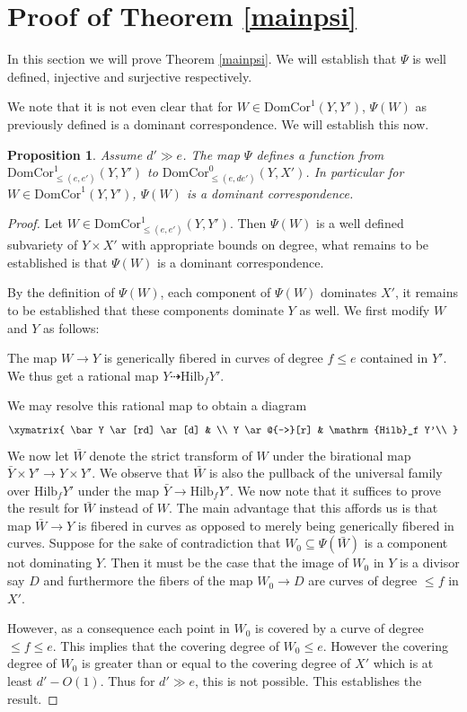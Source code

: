 \documentclass[12pt]{amsart}
\numberwithin{equation}{section}
\newtheorem{proposition}[theorem]{Proposition}
\numberwithin{theorem}{section}
\theoremstyle{definition}
\theoremstyle{definition}
\def\dra{{\dashrightarrow}}
\newcommand{\Hilb}{\mathrm{Hilb}}
\def \DC{{\mathrm{DomCor}}}
\begin{document}
\section{Proof of Theorem \ref{mainpsi}}
In this section we will prove Theorem \ref{mainpsi}. We will establish that  $\Psi$ is well defined, injective and surjective respectively.

We note that it is not even clear that for $W \in \DC^1(Y,Y')$, $\Psi(W)$ as previously defined is a dominant correspondence. We will establish this now. 
\begin{proposition} Assume $d' \gg e$.
    The map $\Psi$ defines a function from  $\DC^1_{\le (e,e')} (Y, Y')$ to $\DC^0 _{\le (e,de')}(Y,X')$. In particular for  $W \in \DC^1(Y,Y')$, $\Psi(W)$ is a dominant correspondence.
\end{proposition}
\begin{proof}
      Let $W \in \DC^1_{\le (e,e')} (Y, Y').$ Then $\Psi(W)$ is a well defined subvariety of $Y \times X'$ with appropriate bounds on degree, what remains to be established is that $\Psi(W)$ is a dominant correspondence.

      By the definition of $\Psi(W)$, each component of $\Psi(W)$ dominates $X'$, it remains to be established that these components dominate $Y$ as well.
      We first modify $W $ and $Y$ as follows:
    
    The map $W \to Y$ is generically fibered in curves of degree $f \le e$ contained in $Y'$. We thus get a rational map $Y \dra \Hilb_f Y'$.

     We may resolve this rational map to obtain a diagram 
\[
    \xymatrix{
\bar Y \ar[rd] \ar[d] & \\
Y \ar@{-->}[r] & \Hilb_f Y'\\
}
\]
We now let $\bar W$ denote the strict transform of $W$ under the birational map $\bar Y \times Y' \to Y \times Y'$. We observe that $\bar W$ is also the pullback of the universal family over $\Hilb_f Y'$  under the map $\bar Y \to \Hilb_f Y'$.
We now note that it suffices to prove the result for $\bar W$ instead of $W$. The main advantage that this affords us is that map $\bar W \to Y$ is fibered in curves as opposed to merely being generically fibered in curves. 
Suppose for the sake of contradiction that  $W_0 \subseteq \Psi(\bar W)$ is a component not dominating $Y$. Then it must be the case that the image of $W_0$ in $Y$ is a divisor say $D$ and furthermore the fibers of the map $W_0 \to D $ are curves of degree $\le f$ in $X'$.

 However, as a consequence each point in $W_0$ is covered by a curve of degree $\le f \le e$. This implies that the covering degree of $W_0 \le e$. However the covering degree of $W_0$ is greater than or equal to the covering degree of $X'$ which is at least $d' - O(1)$. Thus for $d' \gg e$, this is not possible. This establishes the result. 
\end{proof}
\end{document}
